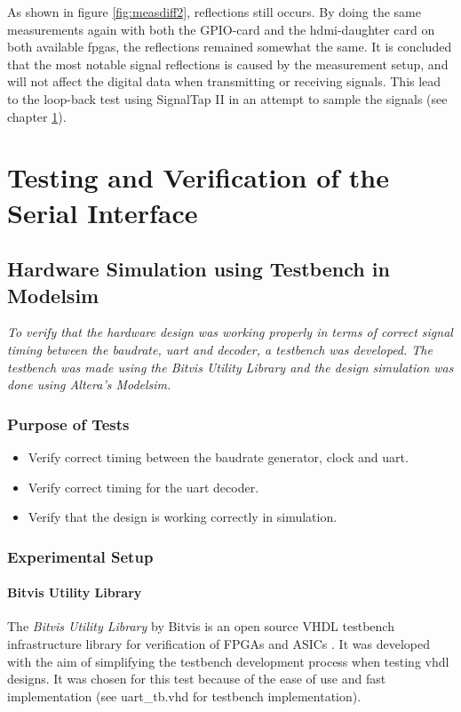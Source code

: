 \documentclass[main.tex]{subfiles}
\begin{document}
As shown in figure \ref{fig:measdiff2}, reflections still occurs. By doing the same measurements again with both the GPIO-card and the \gls{hdmi}-daughter card on both available \glspl{fpga}, the reflections remained somewhat the same. It is concluded that the most notable signal reflections is caused by the measurement setup, and will not affect the digital data when transmitting or receiving signals. This lead to the loop-back test using SignalTap II in an attempt to sample the signals (see chapter \ref{chap:sertest}).

\chapter{Testing and Verification of the Serial Interface} \label{chap:sertest}

\section{Hardware Simulation using Testbench in Modelsim}

\textit{To verify that the hardware design was working properly in terms of correct signal timing between the baudrate, \acrshort{uart} and decoder, a testbench was developed. The testbench was made using the \textit{Bitvis Utility Library} and the design simulation was done using Altera's Modelsim.}

\subsection{Purpose of Tests}

\begin{itemize}\setlength{\itemsep}{10pt}
\item Verify correct timing between the baudrate generator, clock and uart.
\item Verify correct timing for the uart decoder.
\item Verify that the design is working correctly in simulation.
\end{itemize}

\subsection{Experimental Setup}
\subsubsection{Bitvis Utility Library}
The \textit{Bitvis Utility Library} by Bitvis is an open source VHDL testbench infrastructure library for verification of FPGAs and ASICs \cite{bitvis16}. It was developed with the aim of simplifying the testbench development process when testing \acrshort{vhdl} designs. It was chosen for this test because of the ease of use and fast implementation (see uart\_tb.vhd for testbench implementation).\\
\end{document}
